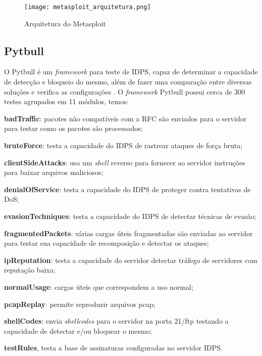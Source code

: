  \begin{figure}[!htb]
  \centering
  \caption{Arquitetura do Metasploit}
  \texttt{[image: metasploit\_arquitetura.png]}
  \label{fig:metasploit-arquitetura}
 \end{figure}

 \subsection{Pytbull} \label{sec:pytbull}

 O Pytbull é um \textit{framework} para teste de IDPS, capaz de determinar a capacidade de detecção e bloqueio do mesmo, além de fazer uma comparação entre diversas soluções e verifica as configurações \cite{pytbull}. O \textit{framework} Pytbull possui cerca de 300 testes agrupados em 11 módulos, temos:

 \begin{alineas}
  \item \textbf{badTraffic}: pacotes não compatíveis com a RFC são enviados para o servidor para testar como os pacotes são processados; 
  \item \textbf{bruteForce}: testa a capacidade do IDPS de rastrear ataques de força bruta;
  \item \textbf{clientSideAttacks}: usa um \textit{shell} reverso para fornecer ao servidor instruções para baixar arquivos maliciosos; 
  \item \textbf{denialOfService}: testa a capacidade do IDPS de proteger contra tentativas de DoS; 
  \item \textbf{evasionTechniques}: testa a capacidade do IDPS de detectar técnicas de evasão; 
  \item \textbf{fragmentedPackets}: várias cargas úteis fragmentadas são enviadas ao servidor para testar sua capacidade de recomposição e detectar os ataques; 
  \item \textbf{ipReputation}: testa a capacidade do servidor detectar tráfego de servidores com reputação baixa;
  \item \textbf{normalUsage}: cargas úteis que correspondem a uso normal; 
  \item \textbf{pcapReplay}: permite reproduzir arquivos pcap; 
  \item \textbf{shellCodes}: envia \textit{shellcodes} para o servidor na porta 21/ftp testando a capacidade de detectar e/ou bloquear o mesmo; 
  \item \textbf{testRules}, testa a base de assinaturas configuradas no servidor IDPS.
 \end{alineas}

